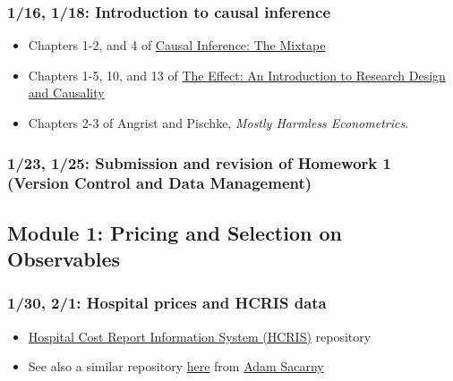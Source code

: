 \documentclass[11pt,]{article}
\providecommand{\tightlist}{%
  \setlength{\itemsep}{0pt}\setlength{\parskip}{0pt}}
\begin{document}
\hypertarget{introduction-to-causal-inference}{%
\subsubsection{1/16, 1/18: Introduction to causal
inference}\label{introduction-to-causal-inference}}

\begin{itemize}
\tightlist
\item
  Chapters 1-2, and 4 of \href{https://mixtape.scunning.com/}{Causal
  Inference: The Mixtape}
\item
  Chapters 1-5, 10, and 13 of \href{https://theeffectbook.net/}{The
  Effect: An Introduction to Research Design and Causality}
\item
  Chapters 2-3 of Angrist and Pischke, \emph{Mostly {Harmless}
  {Econometrics}}.
\end{itemize}

\hypertarget{submission-and-revision-of-homework-1-version-control-and-data-management}{%
\subsubsection{1/23, 1/25: Submission and revision of Homework 1
(Version Control and Data
Management)}\label{submission-and-revision-of-homework-1-version-control-and-data-management}}

\hypertarget{module-1-pricing-and-selection-on-observables}{%
\subsection{Module 1: Pricing and Selection on
Observables}\label{module-1-pricing-and-selection-on-observables}}

\hypertarget{hospital-prices-and-hcris-data}{%
\subsubsection{1/30, 2/1: Hospital prices and HCRIS
data}\label{hospital-prices-and-hcris-data}}

\begin{itemize}
\tightlist
\item
  \href{https://github.com/imccart/HCRIS}{Hospital Cost Report
  Information System (HCRIS)} repository
\item
  See also a similar repository
  \href{https://github.com/asacarny/hospital-cost-reports}{here} from
  \href{http://sacarny.com/}{Adam Sacarny}
\end{itemize}
\end{document}

